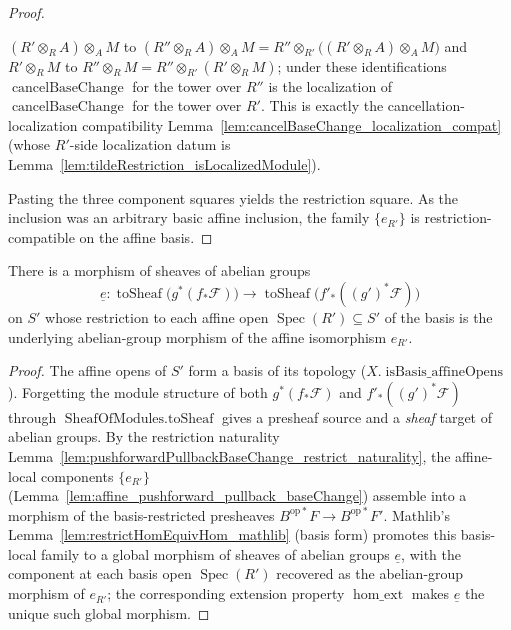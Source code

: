 \begin{proof}
\begin{itemize}
      \((R'\otimes_R A)\otimes_A M\) to \((R''\otimes_R A)\otimes_A M = R'' \otimes_{R'}
      \bigl((R'\otimes_R A)\otimes_A M\bigr)\) and \(R'\otimes_R M\) to
      \(R''\otimes_R M = R'' \otimes_{R'} (R'\otimes_R M)\); under these identifications
      \(\operatorname{cancelBaseChange}\) for the tower over \(R''\) is the localization
      of \(\operatorname{cancelBaseChange}\) for the tower over \(R'\). This is exactly the
      cancellation-localization compatibility
      Lemma~\ref{lem:cancelBaseChange_localization_compat} (whose \(R'\)-side localization
      datum is Lemma~\ref{lem:tildeRestriction_isLocalizedModule}).
  \end{itemize}
  Pasting the three component squares yields the restriction square. As the inclusion
  was an arbitrary basic affine inclusion, the family \(\{e_{R'}\}\) is restriction-
  compatible on the affine basis.
\end{proof}

\begin{lemma}
  \label{lem:pushforwardPullbackBaseChange_abHom}
  There is a morphism of sheaves of abelian groups
  \[
    \underline{e} :
    \operatorname{toSheaf}\bigl(g^*(f_*\mathcal{F})\bigr)
    \longrightarrow
    \operatorname{toSheaf}\bigl(f'_*((g')^*\mathcal{F})\bigr)
  \]
  on \(S'\) whose restriction to each affine open
  \(\operatorname{Spec}(R') \subseteq S'\) of the basis is the underlying
  abelian-group morphism of the affine isomorphism \(e_{R'}\).
\end{lemma}

\begin{proof}
  The affine opens of \(S'\) form a basis of its topology
  (\(X.\operatorname{isBasis\_affineOpens}\)). Forgetting the module structure of both
  \(g^*(f_*\mathcal{F})\) and \(f'_*((g')^*\mathcal{F})\) through
  \(\operatorname{SheafOfModules.toSheaf}\) gives a presheaf source and a \emph{sheaf}
  target of abelian groups. By the restriction naturality
  Lemma~\ref{lem:pushforwardPullbackBaseChange_restrict_naturality}, the affine-local
  components \(\{e_{R'}\}\) (Lemma~\ref{lem:affine_pushforward_pullback_baseChange})
  assemble into a morphism of the basis-restricted presheaves
  \(B^{\mathrm{op}*}F \to B^{\mathrm{op}*}F'\). Mathlib's
  Lemma~\ref{lem:restrictHomEquivHom_mathlib} (basis form) promotes this basis-local
  family to a global morphism of sheaves of abelian groups \(\underline{e}\), with the
  component at each basis open \(\operatorname{Spec}(R')\) recovered as the
  abelian-group morphism of \(e_{R'}\); the corresponding extension property
  \(\operatorname{hom\_ext}\) makes \(\underline{e}\) the unique such global morphism.
\end{proof}

